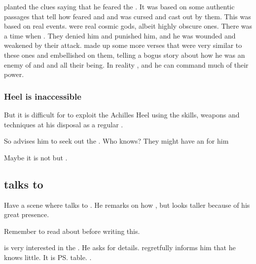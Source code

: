\Ishnaruchaefir planted the clues saying that he feared the \malgryph.
It was based on some authentic \WanderersInDarknessEmph passages that tell how \Ishnaruchaefir feared \Zaz and \Urzaz and was cursed and cast out by them.
This was based on real events.
 were real cosmic gods, albeit highly obscure ones. 
There was a time when . 
They denied him and punished him, and he was wounded and weakened by their attack.
\Ishnaruchaefir made up some more \WanderersInDarknessEmph verses that were very similar to these ones and embellished on them, telling a bogus story about how he was an enemy of \Zaz and \Urzaz and all their being. 
In reality , and he can command much of their power.





\subsubsection{Heel is inaccessible}
But it is difficult for \Teshrial{} to exploit the Achilles Heel using the skills, weapons and techniques at his disposal as a regular \resphan. 

So \Menessiaraid{} advises him to seek out the . 
Who knows? 
They might have an  for him\prikker

Maybe it is not \Menessiaraid{} but \Azraid{} . 








\subsection{\Teshrial talks to \Azraid}
Have a scene where \Teshrial{} talks to . 
He remarks on how , but looks taller because of his great presence. 

Remember to read about  before writing this. 

\Azraid{} is very interested in the \vertexspike{}. 
He asks \Teshrial{} for details. 
\Teshrial{} regretfully informs him that he knows little. 
It is \ps{\Achsah} table. 
\Azraid{} . 

